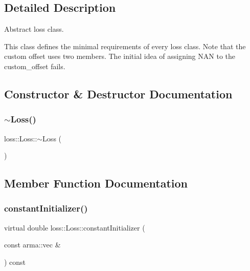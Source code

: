 \subsection{Detailed Description}
Abstract loss class. 

This class defines the minimal requirements of every loss class. Note that the custom offset uses two members. The initial idea of assigning {\ttfamily N\+AN} to the {\ttfamily custom\+\_\+offset} fails. 

\subsection{Constructor \& Destructor Documentation}
\mbox{\label{classloss_1_1_loss_a868a7908fd97590b6c4fc69f4eb3c570}} 
\subsubsection{\texorpdfstring{$\sim$\+Loss()}{~Loss()}}
{\footnotesize\ttfamily loss\+::\+Loss\+::$\sim$\+Loss (\begin{DoxyParamCaption}{ }\end{DoxyParamCaption})\hspace{0.3cm}{\ttfamily [virtual]}}



\subsection{Member Function Documentation}
\mbox{\label{classloss_1_1_loss_a65fe7dcd9370e6a549b8d1cc95fc8798}} 
\subsubsection{\texorpdfstring{constant\+Initializer()}{constantInitializer()}}
{\footnotesize\ttfamily virtual double loss\+::\+Loss\+::constant\+Initializer (\begin{DoxyParamCaption}\item[{const arma\+::vec \&}]{ }\end{DoxyParamCaption}) const\hspace{0.3cm}{\ttfamily [pure virtual]}}



